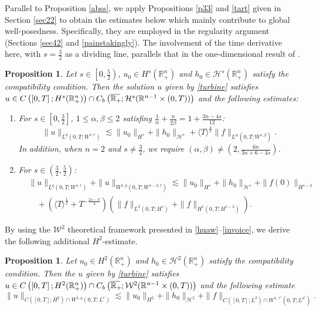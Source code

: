 \documentclass[preprint,compress,12pt]{elsarticle}
\newtheorem{proposition}[theorem]{Proposition}
\numberwithin{equation}{section}
\begin{document}
Parallel to Proposition \ref{abss}, we apply Propositions \ref{p33} and \ref{tart} given in Section \ref{sec22} to obtain the estimates below which mainly contribute to global well-posedness. Specifically, they are employed in the regularity argument (Sections \ref{sec42} and \ref{painstakingly}). The involvement of the time derivative here, with $s=\frac{3}{2}$ as a  dividing line,  parallels that in the one-dimensional result of \cite{figment}.
\begin{proposition}\label{mago}
	Let $s\in \left[0,\frac{5}{2}\right)$, $u_{0}\in H^{s}(\mathbb{R}_{+}^{n})$ and
	$h_{0}\in\mathcal{H}^{s}(\mathbb{R}_{+}^{n})$ satisfy the  compatibility condition. Then the solution $u$ given by \eqref{turbine} satisfies $u\in C\left(\left[0,T\right];H^{s}(\mathbb{R}^{n}_{+})\right)\cap C_{b}\left(\overline{\mathbb{R}_{+}\mkern-4mu}\,;\mathcal{H}^{s}(\mathbb{R}^{n-1}\times(0,T))\right)$ and the following estimates:
	\begin{enumerate}[label=(\arabic*)]
		\item For $s\in\left[0,\frac{3}{2}\right]$, $1\leq \alpha,\beta\leq2$ satisfing $\frac{1}{\alpha}+\frac{n}{2\beta}=1+\frac{3n-4s}{12}$:
		\begin{equation}\label{buffoon}
			\|u\|_{L^{q}(0,T;W^{s,r})}\lesssim \|u_{0}\|_{H^{s}}+\|h_{0}\|_{\mathcal{H}^{s}}+\langle T\rangle^{\frac{s}{3}}\|f\|_{L^{\alpha}(0,T;W^{s,\beta})}.
		\end{equation}
		In addition,  when  $n=2$ and $s\neq\frac{3}{2}$, we require $\left(\alpha,\beta\right)\neq \left(2,\frac{6n}{3n+6-4s}\right)$.
		\item For $s\in \left(\frac{3}{2},\frac{5}{2}\right)$:
		\begin{equation}\label{aggravate}
			\begin{aligned}
				&\|u\|_{L^{q}(0,T;W^{s,r})}+\|u\|_{W^{1,q}(0,T;W^{s-2,r})}
				\lesssim \|u_{0}\|_{H^{s}}+\|h_{0}\|_{\mathcal{H}^{s}}+\|f(0)\|_{H^{s-2}}\\
				&\quad
				+\left(\langle T\rangle^{\frac{1}{2}}+T^{-\frac{2s-3}{4}}\right)\left(\|f\|_{L^{2}(0,T;H^{s}) }+\|f\|_{H^{1}(0,T;H^{s-2})}\right).
			\end{aligned}
		\end{equation}
	\end{enumerate}
\end{proposition}
By using the $\mathcal{W}^{2}$ theoretical framework presented in \eqref{huaw}--\eqref{invoice}, we derive the following additional $H^{2}$-estimate.
\begin{proposition}\label{weak}
	Let $u_{0}\in H^{2}(\mathbb{R}_{+}^{n})$ and $h_{0}\in\mathcal{H}^{2}(\mathbb{R}^{n}_{+})$ satisfy the  compatibility condition. Then the $u$ given by \eqref{turbine} satisfies \(u\in C\left(\left[0,T\right];H^{2}(\mathbb{R}^{n}_{+})\right)\cap C_{b}\left(\overline{\mathbb{R}_{+}\mkern-4mu}\,;\mathcal{W}^{2}(\mathbb{R}^{n-1}\times(0,T))\right)\) and the following estimate
	\begin{equation}\label{begrudge}
		\|u\|_{C([0,T];H^{2})\cap W^{1,q}(0,T;L^{r})}\lesssim\|u_{0}\|_{H^{2}}+\|h_{0}\|_{\mathcal{H}^{2}}+\|f\|_{C([0,T];L^{2})\cap W^{1,\gamma'}(0,T;L^{\rho'})}.
	\end{equation}
	
	
\end{proposition}	
\end{document}
